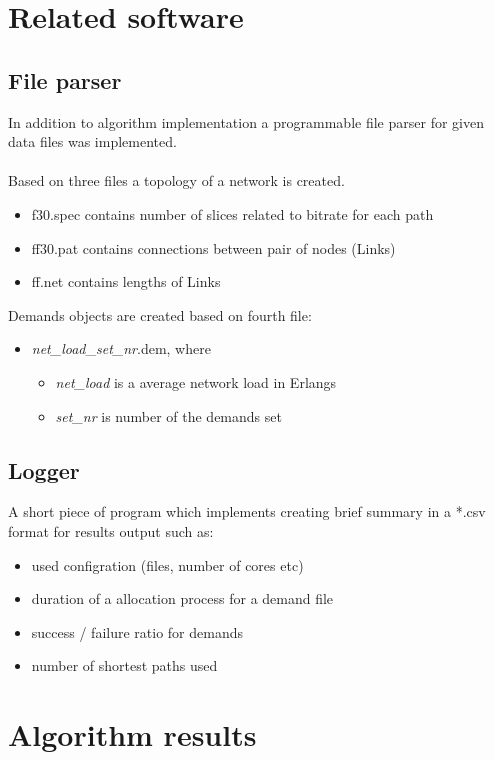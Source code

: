 \documentclass[conference]{IEEEtran}
\begin{document}
\section{Related software}
\subsection{File parser}
In addition to algorithm implementation a programmable file parser for given data files was implemented.
\\ \\
Based on three files a topology of a network is created. 
\begin{itemize}
\item f30.spec contains number of slices related to bitrate for each path
\item ff30.pat contains connections between pair of nodes (Links)
\item ff.net contains lengths of Links 
\end{itemize}

\noindent Demands objects are created based on fourth file:
\begin{itemize}
\item \textit{net\_load}\_\textit{set\_nr}.dem, where
\begin{itemize}
\item \textit{net\_load} is a average network load in Erlangs
\item \textit{set\_nr} is number of the demands set
\end{itemize}
\end{itemize}

\subsection{Logger}
A short piece of program which implements creating brief summary in a *.csv format for results output such as:
\begin{itemize}
\item used configration (files, number of cores etc)
\item duration of a allocation process for a demand file
\item success / failure ratio for demands
\item number of shortest paths used
\end{itemize}

\section{Algorithm results}
\begin{footnotesize}
\end{footnotesize}
\end{document}
